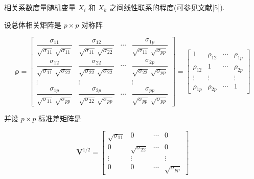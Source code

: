 相关系数度量随机变量 $X_i$ 和 $X_k$ 之间线性联系的程度(可参见文献[5]).

设总体相关矩阵是 $p\times p$ 对称阵

\label{eq:2-34}
\begin{equation}
\bm{\rho}=\begin{bmatrix}
\dfrac{\sigma_{11}}{\sqrt{\sigma_{11}}\,\sqrt{\sigma_{11}}} & \dfrac{\sigma_{12}}{\sqrt{\sigma_{11}}\,\sqrt{\sigma_{22}}} & \cdots & \dfrac{\sigma_{1p}}{\sqrt{\sigma_{11}}\,\sqrt{\sigma_{pp}}}\\[2ex]
\dfrac{\sigma_{12}}{\sqrt{\sigma_{11}}\,\sqrt{\sigma_{22}}} & \dfrac{\sigma_{22}}{\sqrt{\sigma_{22}}\,\sqrt{\sigma_{22}}} & \cdots & \dfrac{\sigma_{2p}}{\sqrt{\sigma_{22}}\,\sqrt{\sigma_{pp}}}\\[2ex]
\vdots & \vdots & & \vdots\\[1ex]
\dfrac{\sigma_{1p}}{\sqrt{\sigma_{11}}\,\sqrt{\sigma_{pp}}} & \dfrac{\sigma_{2p}}{\sqrt{\sigma_{22}}\,\sqrt{\sigma_{pp}}} & \cdots & \dfrac{\sigma_{pp}}{\sqrt{\sigma_{pp}}\,\sqrt{\sigma_{pp}}}
\end{bmatrix}
=\begin{bmatrix}
1 & \rho_{12} & \cdots & \rho_{1p}\\
\rho_{12} & 1 & \cdots & \rho_{2p}\\
\vdots & \vdots & & \vdots\\
\rho_{1p} & \rho_{2p} & \cdots & 1
\end{bmatrix} \tag{2-34}
\end{equation}

并设 $p\times p$ 标准差矩阵是

\label{eq:2-35}
\begin{equation}
\bm{V}^{1/2}=\begin{bmatrix}
\sqrt{\sigma_{11}} & 0 & \cdots & 0\\
0 & \sqrt{\sigma_{22}} & \cdots & 0\\
\vdots & \vdots & & \vdots\\
0 & 0 & \cdots & \sqrt{\sigma_{pp}}
\end{bmatrix} \tag{2-35}
\end{equation}
